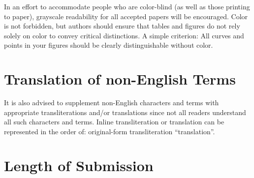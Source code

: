 \documentclass[11pt,a4paper]{article}
\begin{document}
In an effort to accommodate people who are color-blind (as well as those printing
to paper), grayscale readability for all accepted papers will be
encouraged.  Color is not forbidden, but authors should ensure that
tables and figures do not rely solely on color to convey critical
distinctions. A simple criterion: All curves and points in your figures should be clearly distinguishable without color.




\section{Translation of non-English Terms}

It is also advised to supplement non-English characters and terms
with appropriate transliterations and/or translations
since not all readers understand all such characters and terms.
Inline transliteration or translation can be represented in
the order of: original-form transliteration ``translation''.

\section{Length of Submission}
\label{sec:length}
\end{document}
